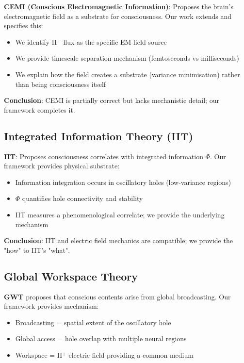 \documentclass[12pt,a4paper]{article}
\begin{document}
\textbf{CEMI (Conscious Electromagnetic Information)}: Proposes the brain's electromagnetic field as a substrate for consciousness. Our work extends and specifies this:
\begin{itemize}
\item We identify H$^+$ flux as the specific EM field source
\item We provide timescale separation mechanism (femtoseconds vs milliseconds)
\item We explain how the field creates a substrate (variance minimisation) rather than being consciousness itself
\end{itemize}

\textbf{Conclusion}: CEMI is partially correct but lacks mechanistic detail; our framework completes it.

\subsection{Integrated Information Theory (IIT)}

\textbf{IIT}: Proposes consciousness correlates with integrated information $\Phi$. Our framework provides physical substrate:
\begin{itemize}
\item Information integration occurs in oscillatory holes (low-variance regions)
\item $\Phi$ quantifies hole connectivity and stability
\item IIT measures a phenomenological correlate; we provide the underlying mechanism
\end{itemize}

\textbf{Conclusion}: IIT and electric field mechanics are compatible; we provide the "how" to IIT's "what".

\subsection{Global Workspace Theory}

\textbf{GWT} proposes that conscious contents arise from global broadcasting. Our framework provides mechanism:
\begin{itemize}
\item Broadcasting = spatial extent of the oscillatory hole
\item Global access = hole overlap with multiple neural regions
\item Workspace = H$^+$ electric field providing a common medium
\end{itemize}
\end{document}
